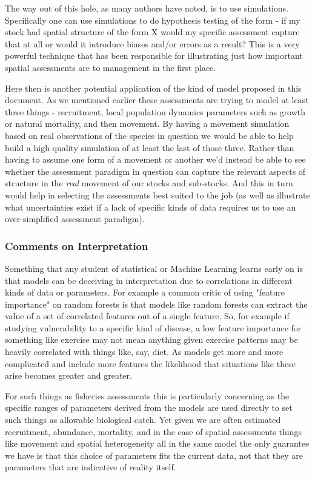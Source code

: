 \documentclass[11pt]{article}
\begin{document}
The way out of this hole, as many authors have noted, is to use simulations. Specifically one can use simulations to do hypothesis testing of the form - if my stock had spatial structure of the form X would my specific assessment capture that at all or would it introduce biases and/or errors as a result? This is a very powerful technique that has been responsible for illustrating just how important spatial assessments are to management in the first place.\newline

Here then is another potential application of the kind of model proposed in this document. As we mentioned earlier these assessments are trying to model at least three things - recruitment, local population dynamics parameters such as growth or natural mortality, and then movement. By having a movement simulation based on real observations of the species in question we would be able to help build a high quality simulation of at least the last of those three. Rather than having to assume one form of a movement or another we'd instead be able to see whether the assessment paradigm in question can capture the relevant aspects of structure in the \textit{real} movement of our stocks and sub-stocks. And this in turn would help in selecting the assessments best suited to the job (as well as illustrate what uncertainties exist if a lack of specific kinds of data requires us to use an over-simplified assessment paradigm). 

\subsubsection{Comments on Interpretation}

Something that any student of statistical or Machine Learning learns early on is that models can be deceiving in interpretation due to correlations in different kinds of data or parameters. For example a common critic of using "feature importance" on random forests is that models like random forests can extract the value of a set of correlated features out of a single feature. So, for example if studying vulnerability to a specific kind of disease, a low feature importance for something like exercise may not mean anything given exercise patterns may be heavily correlated with things like, say, diet. As models get more and more complicated and include more features the likelihood that situations like these arise becomes greater and greater. 

For such things as fisheries assessments this is particularly concerning as the specific ranges of parameters derived from the models are used directly to set such things as allowable biological catch. Yet given we are often estimated recruitment, abundance, mortality, and in the case of spatial assessments things like movement and spatial heterogeneity all in the same model the only guarantee we have is that this choice of parameters fits the current data, not that they are parameters that are indicative of reality itself. 
\end{document}
